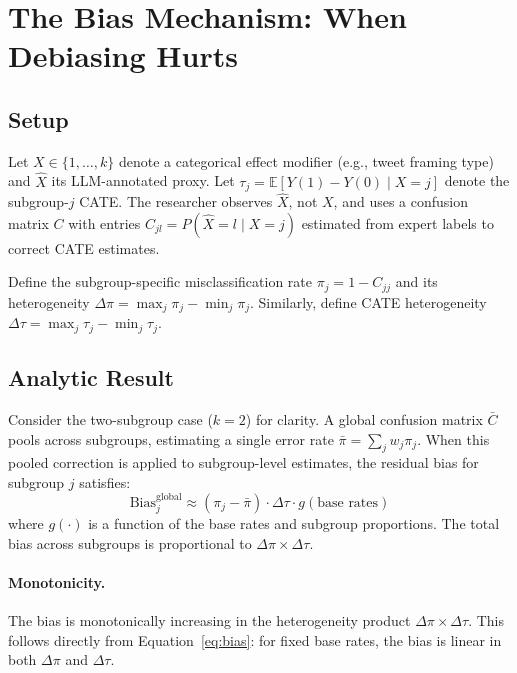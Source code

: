 \documentclass[11pt,a4paper]{article}
\begin{document}
\section{The Bias Mechanism: When Debiasing Hurts}
\label{sec:bias}

\subsection{Setup}

Let $X \in \{1, \ldots, k\}$ denote a categorical effect modifier (e.g., tweet framing type) and $\hat{X}$ its LLM-annotated proxy.
Let $\tau_j = \mathbb{E}[Y(1) - Y(0) \mid X = j]$ denote the subgroup-$j$ CATE.
The researcher observes $\hat{X}$, not $X$, and uses a confusion matrix $C$ with entries $C_{jl} = P(\hat{X} = l \mid X = j)$ estimated from expert labels to correct CATE estimates.

Define the subgroup-specific misclassification rate $\pi_j = 1 - C_{jj}$ and its heterogeneity $\Delta\pi = \max_j \pi_j - \min_j \pi_j$.
Similarly, define CATE heterogeneity $\Delta\tau = \max_j \tau_j - \min_j \tau_j$.

\subsection{Analytic Result}

Consider the two-subgroup case ($k = 2$) for clarity.
A global confusion matrix $\bar{C}$ pools across subgroups, estimating a single error rate $\bar{\pi} = \sum_j w_j \pi_j$.
When this pooled correction is applied to subgroup-level estimates, the residual bias for subgroup $j$ satisfies:
\begin{equation}
\text{Bias}_j^{\text{global}} \approx (\pi_j - \bar{\pi}) \cdot \Delta\tau \cdot g(\text{base rates})
\label{eq:bias}
\end{equation}
where $g(\cdot)$ is a function of the base rates and subgroup proportions.
The total bias across subgroups is proportional to $\Delta\pi \times \Delta\tau$.

\paragraph{Monotonicity.}
The bias is monotonically increasing in the heterogeneity product $\Delta\pi \times \Delta\tau$.
This follows directly from Equation~\ref{eq:bias}: for fixed base rates, the bias is linear in both $\Delta\pi$ and $\Delta\tau$.
\end{document}
